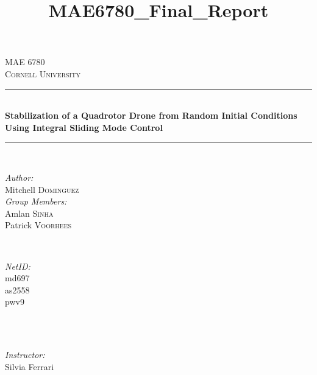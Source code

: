 \documentclass[12pt]{article}
\title{MAE6780_Final_Report}
\begin{document}
\begin{titlepage}

\newcommand{\HRule}{\rule{\linewidth}{0.5mm}} %

\center %
 


\textsc{\Large MAE 6780}\\[0.5cm] %
\textsc{\large Cornell University}\\[0.5cm] %


\HRule \\[0.4cm]
{ \huge \bfseries Stabilization of a Quadrotor Drone from Random Initial Conditions Using Integral Sliding Mode Control}\\[0.4cm] %
\HRule \\[1.5cm]
 

\begin{minipage}{0.4\textwidth}
\begin{flushleft} \large
\emph{Author:}\\
Mitchell \textsc{Dominguez}\\
\emph{Group Members:}\\
Amlan \textsc{Sinha}\\
Patrick \textsc{Voorhees}\\
\end{flushleft}
\end{minipage}
~
\begin{minipage}{0.4\textwidth}
\begin{flushright} \large
\emph{NetID:} \\
md697\\
\vspace{23pt}
as2558\\
pwv9\\
\end{flushright}
\end{minipage}\\[2cm]
~
\begin{minipage}{0.4\textwidth}
\begin{center} \large
\emph{Instructor:}\\
Silvia Ferrari\\
\end{center}
\end{minipage}
\linebreak
\linebreak


\end{titlepage}
\end{document}
